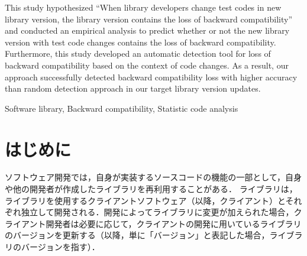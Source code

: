 \documentclass[submit]{ipsj}
\begin{document}
\begin{eabstract}
This study hypothesized ``When library developers change test codes in new library version, the library version contains the loss of backward compatibility'' and conducted an empirical analysis to predict whether or not the new library version with test code changes contains the loss of backward compatibility. Furthermore, this study developed an automatic detection tool for loss of backward compatibility based on the context of code changes. As a result, our approach successfully detected backward compatibility loss with higher accuracy than random detection approach in our target library version updates.
\end{eabstract}

\begin{ekeyword}
Software library, Backward compatibility, Statistic code analysis
\end{ekeyword}

\maketitle

\section{はじめに}

ソフトウェア開発では，自身が実装するソースコードの機能の一部として，自身や他の開発者が作成したライブラリを再利用することがある．
ライブラリは，ライブラリを使用するクライアントソフトウェア（以降，クライアント）とそれぞれ独立して開発される．開発によってライブラリに変更が加えられた場合，クライアント開発者は必要に応じて，クライアントの開発に用いているライブラリのバージョンを更新する（以降，単に「バージョン」と表記した場合，ライブラリのバージョンを指す）．
\end{document}
